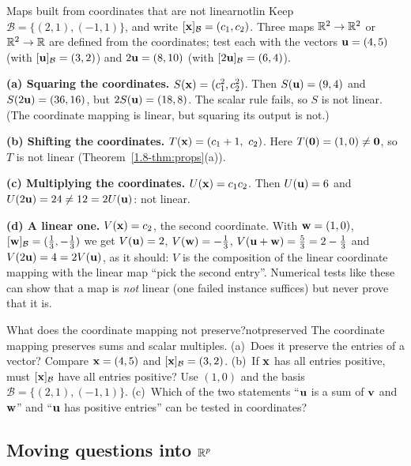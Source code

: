 \documentclass[11pt]{article}
\begin{document}
\begin{exmp}{Maps built from coordinates that are not linear}{notlin}
Keep $\mathcal{B}=\{(2,1),(-1,1)\}$, and write $[\mathbf{x}]_{\mathcal{B}}=(c_1,c_2)$. Three maps $\mathbb{R}^2\to\mathbb{R}^2$ or $\mathbb{R}^2\to\mathbb{R}$ are defined from the coordinates; test each with the vectors $\mathbf{u}=(4,5)$ (with $[\mathbf{u}]_{\mathcal{B}}=(3,2)$) and $2\mathbf{u}=(8,10)$ (with $[2\mathbf{u}]_{\mathcal{B}}=(6,4)$).

\textbf{(a) Squaring the coordinates.} $S(\mathbf{x})=(c_1^2,c_2^2)$. Then $S(\mathbf{u})=(9,4)$ and $S(2\mathbf{u})=(36,16)$, but $2S(\mathbf{u})=(18,8)$. The scalar rule fails, so $S$ is not linear. (The coordinate mapping is linear, but squaring its output is not.)

\textbf{(b) Shifting the coordinates.} $T(\mathbf{x})=(c_1+1,\ c_2)$. Here $T(\mathbf{0})=(1,0)\neq\mathbf{0}$, so $T$ is not linear (Theorem~\ref{1.8-thm:props}(a)).

\textbf{(c) Multiplying the coordinates.} $U(\mathbf{x})=c_1c_2$. Then $U(\mathbf{u})=6$ and $U(2\mathbf{u})=24\neq12=2U(\mathbf{u})$: not linear.

\textbf{(d) A linear one.} $V(\mathbf{x})=c_2$, the second coordinate. With $\mathbf{w}=(1,0)$, $[\mathbf{w}]_{\mathcal{B}}=(\tfrac13,-\tfrac13)$ we get $V(\mathbf{u})=2$, $V(\mathbf{w})=-\tfrac13$, $V(\mathbf{u}+\mathbf{w})=\tfrac53=2-\tfrac13$ and $V(2\mathbf{u})=4=2V(\mathbf{u})$, as it should: $V$ is the composition of the linear coordinate mapping with the linear map ``pick the second entry''. Numerical tests like these can show that a map is \emph{not} linear (one failed instance suffices) but never prove that it is.
\end{exmp}

\begin{think}{What does the coordinate mapping not preserve?}{notpreserved}
The coordinate mapping preserves sums and scalar multiples. (a)~Does it preserve the entries of a vector? Compare $\mathbf{x}=(4,5)$ and $[\mathbf{x}]_{\mathcal{B}}=(3,2)$. (b)~If $\mathbf{x}$ has all entries positive, must $[\mathbf{x}]_{\mathcal{B}}$ have all entries positive? Use $(1,0)$ and the basis $\mathcal{B}=\{(2,1),(-1,1)\}$. (c)~Which of the two statements ``$\mathbf{u}$ is a sum of $\mathbf{v}$ and $\mathbf{w}$'' and ``$\mathbf{u}$ has positive entries'' can be tested in coordinates?
\end{think}

\subsection*{Moving questions into $\mathbb{R}^p$}
\end{document}
